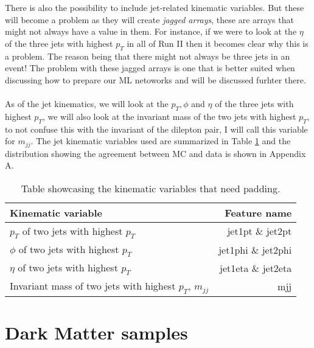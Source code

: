 \documentclass[14pt, a4paper]{book}
\begin{document}
\clearpage\noindent There is also the possibility to include jet-related kinematic variables. But these will become a problem as they will create \textit{jagged arrays}, these are arrays that might not always have a value in them.
For instance, if we were to look at the $\eta$ of the three jets with highest $p_T$ in all of Run II then it becomes clear why this is a problem. The reason being that there might not always be three jets in an event!
The problem with these jagged arrays is one that is better suited when discussing how to prepare our ML netoworks and will be discussed furhter there. \\
\\As of the jet kinematics, we will look at the $p_T, \phi$ and $\eta$ of the three jets with highest $p_T$, we will also look at the invariant mass of the two jets with highest $p_T$, 
to not confuse this with the invariant of the dilepton pair, I will call this variable for $m_{jj}$. The jet kinematic variables used are summarized in Table \ref{tab:paddable_variables} 
and the distribution showing the agreement between MC and data is shown in Appendix A.
\begin{table}[!h]
    \centering
    \begin{tabular}{l|r}\midrule\midrule
        Kinematic variable                                                      & Feature name          \\\midrule
        $p_T$ of two jets with highest $p_T$                                    & jet1pt \& jet2pt\\
        $\phi$ of two jets with highest $p_T$                                   & jet1phi \& jet2phi\\
        $\eta$ of two jets with highest $p_T$                                   & jet1eta \& jet2eta\\
        Invariant mass of two jets with highest $p_T$, $m_{jj}$                 & mjj\\\midrule\midrule
    \end{tabular}
    \caption[Kinematic variables that need padding]{Table showcasing the kinematic variables that need padding.}
    \label{tab:paddable_variables}
\end{table}


\section{Dark Matter samples}
\end{document}
